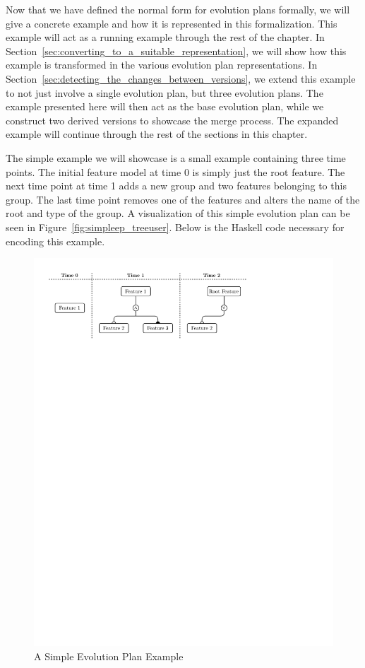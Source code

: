 \documentclass[a4paper,english]{ifimaster}
\begin{document}
Now that we have defined the normal form for evolution plans formally, we will give a concrete example and how it is represented in this formalization. This example will act as a running example through the rest of the chapter. In Section~\vref{sec:converting_to_a_suitable_representation}, we will show how this example is transformed in the various evolution plan representations. In Section~\vref{sec:detecting_the_changes_between_versions}, we extend this example to not just involve a single evolution plan, but three evolution plans. The example presented here will then act as the base evolution plan, while we construct two derived versions to showcase the merge process. The expanded example will continue through the rest of the sections in this chapter.

The simple example we will showcase is a small example containing three time points. The initial feature model at time 0 is simply just the root feature. The next time point at time 1 adds a new group and two features belonging to this group. The last time point removes one of the features and alters the name of the root and type of the group. A visualization of this simple evolution plan can be seen in Figure~\vref{fig:simpleep_treeuser}. Below is the Haskell code necessary for encoding this example.

\begin{figure}[htpb]
  \centering
  \includegraphics[width=\linewidth]{simpleep_treeuser.pdf}
  \caption{A Simple Evolution Plan Example}%
  \label{fig:simpleep_treeuser}
\end{figure}
\end{document}
